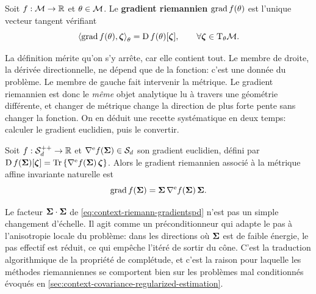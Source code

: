 \begin{definition}
\label{def:context-riemann-gradient}
  Soit $f:\mathcal{M}\to\mathbb{R}$ et $\theta\in\mathcal{M}$. Le \textbf{gradient riemannien} $\operatorname{\operatorname{grad}} f(\theta)$ est l'unique vecteur tangent vérifiant
  \begin{equation}
    \left\langle \operatorname{\operatorname{grad}} f(\theta), \boldsymbol{\zeta} \right\rangle_{\theta}
    =
    \operatorname{\mathrm{D}} f(\theta)[\boldsymbol{\zeta}],
    \qquad
    \forall\boldsymbol{\zeta}\in\mathrm{T}_{\theta}\mathcal{M}.
    \label{eq:context-riemann-defgradient}
  \end{equation}
\end{definition}

La définition mérite qu'on s'y arrête, car elle contient tout. Le membre de droite, la dérivée directionnelle, ne dépend que de la fonction: c'est une donnée du problème. Le membre de gauche fait intervenir la métrique. Le gradient riemannien est donc le \emph{même} objet analytique lu à travers une géométrie différente, et changer de métrique change la direction de plus forte pente sans changer la fonction. On en déduit une recette systématique en deux temps: calculer le gradient euclidien, puis le convertir.

\begin{property}
\label{prop:context-riemann-gradientspd}
  Soit $f:\mathcal{S}_{d}^{++}\to\mathbb{R}$ et $\nabla^{\mathrm{e}}f(\boldsymbol{\Sigma})\in\mathcal{S}_{d}$ son gradient euclidien, défini par $\operatorname{\mathrm{D}} f(\boldsymbol{\Sigma})[\boldsymbol{\zeta}]=\operatorname{\operatorname{Tr}}\left\{\nabla^{\mathrm{e}}f(\boldsymbol{\Sigma})\,\boldsymbol{\zeta}\right\}$. Alors le gradient riemannien associé à la métrique affine invariante naturelle est
  \begin{equation}
    \operatorname{\operatorname{grad}} f(\boldsymbol{\Sigma})
    =
    \boldsymbol{\Sigma}\,\nabla^{\mathrm{e}}f(\boldsymbol{\Sigma})\,\boldsymbol{\Sigma}.
    \label{eq:context-riemann-gradientspd}
  \end{equation}
\end{property}

\begin{remark}
  Le facteur $\boldsymbol{\Sigma}\cdot\boldsymbol{\Sigma}$ de \cref{eq:context-riemann-gradientspd} n'est pas un simple changement d'échelle. Il agit comme un préconditionneur qui adapte le pas à l'anisotropie locale du problème: dans les directions où $\boldsymbol{\Sigma}$ est de faible énergie, le pas effectif est réduit, ce qui empêche l'itéré de sortir du cône. C'est la traduction algorithmique de la propriété de complétude, et c'est la raison pour laquelle les méthodes riemanniennes se comportent bien sur les problèmes mal conditionnés évoqués en \cref{sec:context-covariance-regularized-estimation}.
\end{remark}

